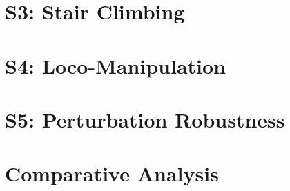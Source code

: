 \lipsum[34]

\begin{criticalinsight}
\end{criticalinsight}

\section{S3: Stair Climbing}
\label{sec:s3}

\lipsum[35]

\begin{criticalinsight}
\end{criticalinsight}

\section{S4: Loco-Manipulation}
\label{sec:s4}


\lipsum[36]

\begin{criticalinsight}
\end{criticalinsight}

\section{S5: Perturbation Robustness}
\label{sec:s5}

\lipsum[37]

\begin{criticalinsight}
\end{criticalinsight}

\section{Comparative Analysis}
\label{sec:comparative}


\lipsum[38]

\begin{criticalinsight}
\end{criticalinsight}
